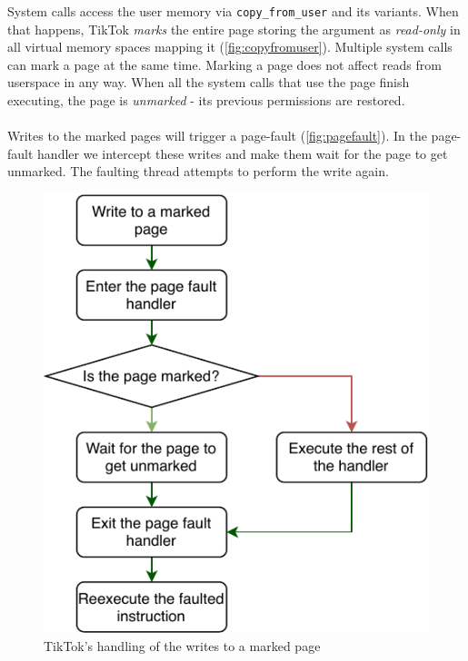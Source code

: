 System calls access the user memory via \texttt{copy\_from\_user} and its variants. When that happens, 
TikTok \emph{marks} the entire page storing the argument as \emph{read-only} in all virtual memory spaces 
mapping it (\autoref{fig:copyfromuser}). Multiple system calls can mark a page at the same time. Marking a page does not affect reads
from userspace in any way. When all the system calls that use the page finish executing, the page is \emph{unmarked} - its
previous permissions are restored.
\\
\\
Writes to the marked pages will trigger a page-fault (\autoref{fig:pagefault}). In the page-fault handler we intercept these writes 
and make them wait for the page to get unmarked. The faulting thread attempts to perform the
write again.

\begin{figure}[]
  \centering
  \includegraphics{img/pagefault.pdf}
  \caption{TikTok's handling of the writes to a marked page}
  \label{fig:pagefault}
\end{figure}

